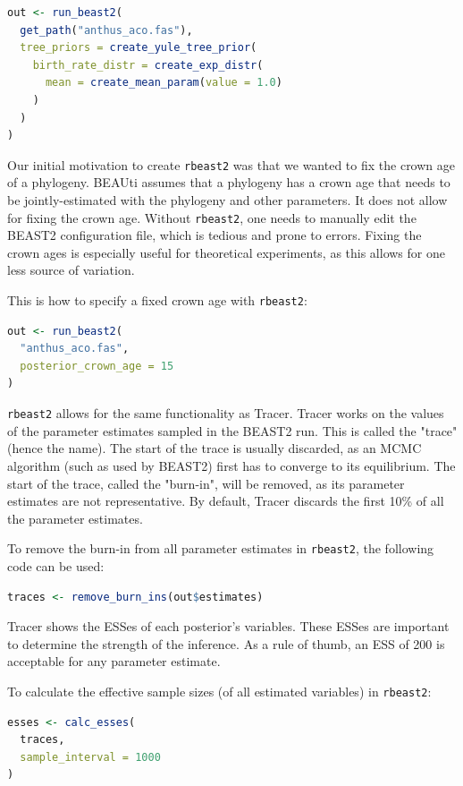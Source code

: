 \documentclass{article}
\begin{document}
\begin{lstlisting}[language=R, floatplacement=H]
out <- run_beast2(
  get_path("anthus_aco.fas"),
  tree_priors = create_yule_tree_prior(
    birth_rate_distr = create_exp_distr(
      mean = create_mean_param(value = 1.0)
    )    
  )
)
\end{lstlisting}

Our initial motivation to create \verb;rbeast2; 
was that we wanted to fix the crown age of a phylogeny.
BEAUti assumes that a phylogeny has a crown age that needs to be jointly-estimated
with the phylogeny and other parameters. It does not allow for fixing
the crown age. Without \verb;rbeast2;, one needs to manually edit the BEAST2 
configuration file, which is tedious and prone to errors. 
Fixing the crown ages is especially useful for theoretical experiments,
as this allows for one less source of variation.

This is how to specify a fixed crown age with \verb;rbeast2;:

\begin{lstlisting}[language=R, floatplacement=H]
out <- run_beast2(
  "anthus_aco.fas",
  posterior_crown_age = 15
)
\end{lstlisting}

\verb;rbeast2; allows for the same functionality as Tracer.
Tracer works on the values of the parameter estimates sampled
in the BEAST2 run. This is called the "trace" (hence the name).
The start of the trace is usually discarded, as an MCMC 
algorithm (such as used by BEAST2) first has to converge to
its equilibrium. The start of the trace, called the "burn-in", 
will be removed, as its parameter estimates are not 
representative. By default, Tracer discards the first 10\% of all 
the parameter estimates. 

To remove the burn-in from all parameter estimates in \verb;rbeast2;,
the following code can be used:

\begin{lstlisting}[language=R, floatplacement=H]
traces <- remove_burn_ins(out$estimates)
\end{lstlisting}

Tracer shows the ESSes of each posterior's variables.
These ESSes are important to determine the strength of the
inference. As a rule of thumb, an ESS of 200 is acceptable 
for any parameter estimate.

To calculate the effective sample sizes (of all estimated variables) in \verb;rbeast2;:

\begin{lstlisting}[language=R, floatplacement=H]
esses <- calc_esses(
  traces, 
  sample_interval = 1000
)
\end{lstlisting}
\end{document}
